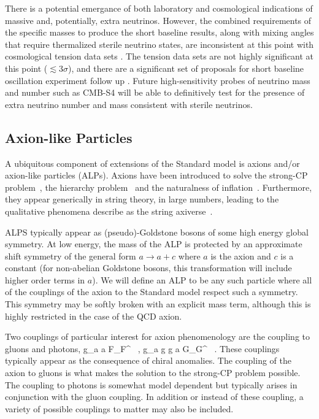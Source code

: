 There is a potential emergance of both laboratory and cosmological
indications of massive and, potentially, extra neutrinos. However, the
combined requirements of the specific masses to produce the short
baseline results, along with mixing angles that require thermalized
sterile neutrino states, are inconsistent at this point with
cosmological tension data sets
\cite{Joudaki:2012uk,Archidiacono:2013xxa}. The tension data sets are
not highly significant at this point ($\lesssim 3\sigma$), and there
are a significant set of proposals for short baseline oscillation
experiment follow up \cite{Abazajian:2012ys}. Future high-sensitivity
probes of neutrino mass and number such as CMB-S4 will be able to
definitively test for the presence of extra neutrino number and mass
consistent with sterile neutrinos.


\subsection{Axion-like Particles}

A ubiquitous component of extensions of the Standard model is axions and/or axion-like particles (ALPs).  Axions have been introduced to solve the strong-CP problem~\cite{Peccei:1977hh}, the hierarchy problem~\cite{Graham:2015cka} and the naturalness of inflation~\cite{Freese:1990rb}.  Furthermore, they appear generically in string theory, in large numbers, leading to the qualitative phenomena describe as the string axiverse~\cite{Arvanitaki:2009fg}.

ALPS typically appear as (pseudo)-Goldstone bosons of some high energy global symmetry.  At low energy, the mass of the ALP is protected by an approximate shift symmetry of the general form $a \to a + c$ where $a$ is the axion and $c$ is a constant (for non-abelian Goldstone bosons, this transformation will include higher order terms in $a$).  We will define an ALP to be any such particle where all of the couplings of the axion to the Standard model respect such a symmetry.  This symmetry may be softly broken with an explicit mass term, although this is highly restricted in the case of the QCD axion.

Two couplings of particular interest for axion phenomenology are the coupling to gluons and photons, 
\beq
{} g_{a \gamma \gamma} a \tilde F_{\mu \nu}F^{\mu\nu} \ , \qquad \qquad {} g_{a g g} a \tilde G_{\mu \nu}G^{\mu\nu}  \ .
\eeq
These couplings typically appear as the consequence of chiral anomalies.  The coupling of the axion to gluons is what makes the solution to the strong-CP problem possible.  The coupling to photons is somewhat model dependent but typically arises in conjunction with the gluon coupling.  In addition or instead of these coupling, a variety of possible couplings to matter may also be included.

